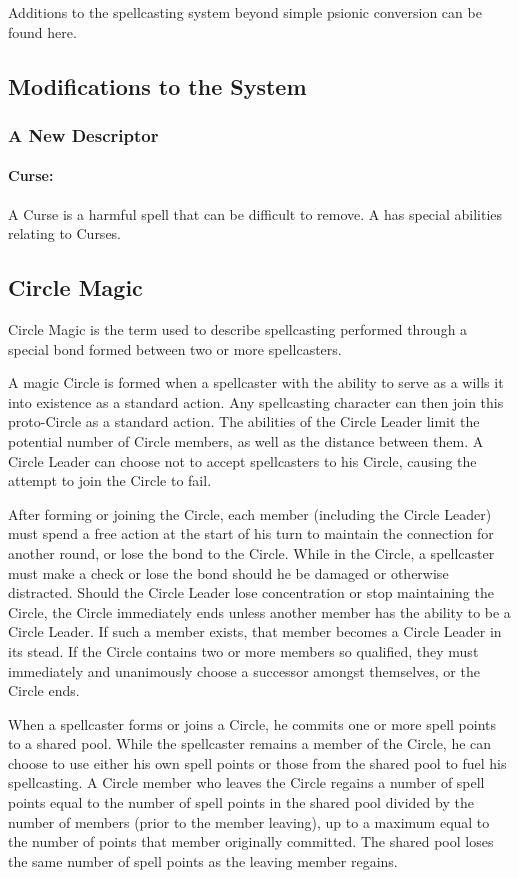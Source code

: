 Additions to the spellcasting system beyond simple psionic conversion can be found here.
\subsection{Modifications to the System}

\subsubsection{A New Descriptor}
\paragraph[Curse]{Curse:} A Curse is a harmful spell that can be difficult to remove. A  has special abilities relating to Curses.
\subsection{Circle Magic}
\label{sec:CircleMagic}
Circle Magic is the term used to describe spellcasting performed through a special bond formed between two or more spellcasters.

A magic Circle is formed when a spellcaster with the ability to serve as a  wills it into existence as a standard action. Any spellcasting character can then join this proto-Circle as a standard action. The abilities of the Circle Leader limit the potential number of Circle members, as well as the distance between them. A Circle Leader can choose not to accept spellcasters to his Circle, causing the attempt to join the Circle to fail.

After forming or joining the Circle, each member (including the Circle Leader) must spend a free action at the start of his turn to maintain the connection for another round, or lose the bond to the Circle. While in the Circle, a spellcaster must make a  check or lose the bond should he be damaged or otherwise distracted.
Should the Circle Leader lose concentration or stop maintaining the Circle, the Circle immediately ends unless another member has the ability to be a Circle Leader. If such a member exists, that member becomes a Circle Leader in its stead. If the Circle contains two or more members so qualified, they must immediately and unanimously choose a successor amongst themselves, or the Circle ends.

When a spellcaster forms or joins a Circle, he commits one or more spell points to a shared pool. While the spellcaster remains a member of the Circle, he can choose to use either his own spell points or those from the shared pool to fuel his spellcasting.
A Circle member who leaves the Circle regains a number of spell points equal to the number of spell points in the shared pool divided by the number of members (prior to the member leaving), up to a maximum equal to the number of points that member originally committed. The shared pool loses the same number of spell points as the leaving member regains.

